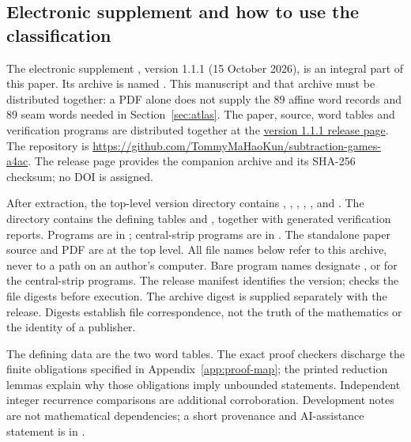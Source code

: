 \documentclass[11pt]{article}
\theoremstyle{remark}\newtheorem{remark}[theorem]{Remark}
\begin{document}
\subsection{Electronic supplement and how to use the classification}\label{sec:supplement}
The electronic supplement \cite{Supplement}, version 1.1.1 (15 October
2026), is an integral part of this paper. Its archive is named
. This manuscript and that
archive must be distributed together: a PDF alone does not supply the
89 affine word records and 89 seam words needed in Section~\ref{sec:atlas}.
The paper, source, word tables and verification programs are distributed
together at the \href{https://github.com/TommyMaHaoKun/subtraction-games-a4ac/releases/tag/v1.1.1}{version 1.1.1 release page}.
The repository is \url{https://github.com/TommyMaHaoKun/subtraction-games-a4ac}.
The release page provides the companion archive and its SHA-256 checksum;
no DOI is assigned.

After extraction, the top-level version directory contains
, , ,
, , and .
The directory  contains the defining tables
 and , together with generated verification
reports. Programs are in ; central-strip programs are in
. The standalone paper source and PDF are at the top level.
All file names below refer to this archive, never to a path on an author's
computer. Bare program names designate , or 
for the central-strip programs. The release manifest identifies the version;
 checks the file digests before execution.
The archive digest is supplied separately with the release. Digests establish
file correspondence, not the truth of the mathematics or the identity of a
publisher.

The defining data are the two word tables. The exact proof checkers discharge
the finite obligations specified in Appendix~\ref{app:proof-map}; the printed
reduction lemmas explain why those obligations imply unbounded statements.
Independent integer recurrence comparisons are additional corroboration.
Development notes are not mathematical dependencies; a short provenance and
AI-assistance statement is in .
\end{document}
